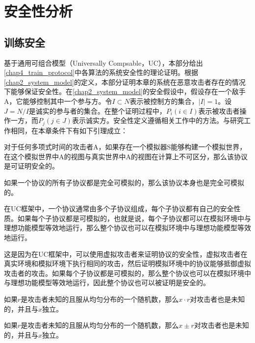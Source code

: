 \section{安全性分析}


\subsection{训练安全}

基于通用可组合模型\cite{Universally_Compsable, Simple_UC}（Universally Compsable，UC），本部分给出\ref{chap4_train_protocol}中各算法的系统安全性的理论证明。根据\ref{chap2_system_model}的定义，本部分证明本章的系统在恶意攻击者存在的情况下能够保证安全性。在\ref{chap2_system_model}的安全假设中，假设存在一个敌手A，它能够控制其中一个参与方。令$I\subset N$表示被控制方的集合，$|I|=1$。设$J = N / I$是诚实的参与者的集合。在整个证明过程中，$P_i  (i∈I)$表示被攻击者操作一方，而$P_j  (j∈J)$表示诚实方。安全性定义遵循相关工作中的方法。与研究工作\cite{SecureNLP, Sim_Proof, Sharemind}相同，在本章条件下有如下引理成立：

\begin{definition}{}
	对于任何多项式时间的攻击者A，如果存在一个模拟器S能够构建一个模拟世界，在这个模拟世界中A的视图与真实世界中A的视图在计算上不可区分，那么该协议是可证明安全的。
\end{definition}


\begin{lemma}
	如果一个协议的所有子协议都是完全可模拟的，那么该协议本身也是完全可模拟的。
\end{lemma}


在UC框架中，一个协议通常由多个子协议组成，每个子协议都有自己的安全性质。如果每个子协议都是可模拟的，也就是说，每个子协议都可以在模拟环境中与理想功能模型等效地运行，那么整个协议也可以在模拟环境中与理想功能模型等效地运行。

这是因为在UC框架中，可以使用虚拟攻击者来证明协议的安全性，虚拟攻击者在真实环境和模拟环境下执行相同的攻击，然后证明模拟环境中的协议能够抵御虚拟攻击者的攻击。如果每个子协议都是可模拟的，那么整个协议也可以在模拟环境中与理想功能模型等效地运行，因此整个协议也可以被证明是安全的。%

\begin{lemma}
	如果$r$是攻击者未知的且服从均匀分布的一个随机数，那么$x\cdot r$对攻击者也是未知的，并且与$x$独立。
\end{lemma}

\begin{lemma} \label{ss_pm}
	如果$r$是攻击者未知的且服从均匀分布的一个随机数，那么$x\pm r$对攻击者也是未知的，并且与$x$独立。
\end{lemma}

